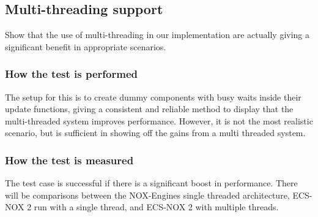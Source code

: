 \subsection{Multi-threading support}
Show that the use of multi-threading in our implementation are actually giving a significant benefit in appropriate scenarios.

\subsubsection*{How the test is performed}
The setup for this is to create dummy components with busy waits inside their update functions, giving a consistent and reliable method to display that the multi-threaded system improves performance. However, it is not the most realistic scenario, but is sufficient in showing off the gains from a multi threaded system.

\subsubsection*{How the test is measured}
The test case is successful if there is a significant boost in performance.
There will be comparisons between the NOX-Engines single threaded architecture, ECS-NOX 2 run with a single thread, and ECS-NOX 2 with multiple threads.
